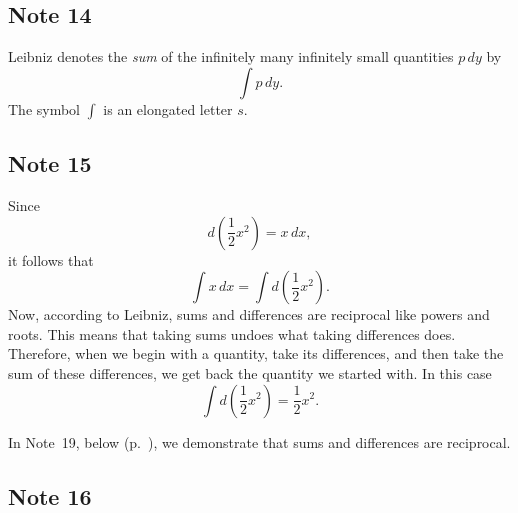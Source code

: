 \documentclass[twoside,openright]{article}
\begin{document}
\subsection*{Note 14}
\label{crg14}

Leibniz denotes the {\em sum} of the infinitely many infinitely small quantities $p\,dy$ by
$$\int\! p\,dy.$$
The symbol $\int$ is an elongated letter $s$.

\subsection*{Note 15}
\label{crg15}

Since 
$$d\left(\frac{1}{2}x^2\right) = x\,dx,$$
it follows that
$$\int\!x\,dx = \int\!d\left(\frac{1}{2}x^2\right).$$
Now, according to Leibniz, sums and differences are reciprocal like
powers and roots.  This means that taking sums undoes what taking
differences does.  Therefore, when we begin with a quantity, take its
differences, and then take the sum of these differences, we get back
the quantity we started with.  In this case
$$ \int\!d\left(\frac{1}{2}x^2\right) = \frac{1}{2}x^2.$$

In Note~19, below (p.~\pageref{crg19}), we demonstrate that sums and differences are reciprocal.

\subsection*{Note 16}
\label{crg16}
\end{document}
